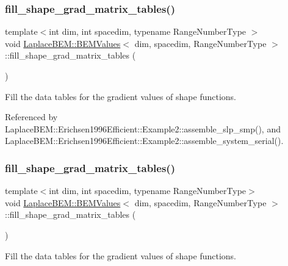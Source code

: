 \subsubsection{\texorpdfstring{fill\+\_\+shape\+\_\+grad\+\_\+matrix\+\_\+tables()}{fill\_shape\_grad\_matrix\_tables()}\hspace{0.1cm}{\footnotesize\ttfamily [1/2]}}
{\footnotesize\ttfamily template$<$int dim, int spacedim, typename Range\+Number\+Type $>$ \\
void \hyperlink{classLaplaceBEM_1_1BEMValues}{Laplace\+B\+E\+M\+::\+B\+E\+M\+Values}$<$ dim, spacedim, Range\+Number\+Type $>$\+::fill\+\_\+shape\+\_\+grad\+\_\+matrix\+\_\+tables (\begin{DoxyParamCaption}{ }\end{DoxyParamCaption})}

Fill the data tables for the gradient values of shape functions. 

Referenced by Laplace\+B\+E\+M\+::\+Erichsen1996\+Efficient\+::\+Example2\+::assemble\+\_\+slp\+\_\+smp(), and Laplace\+B\+E\+M\+::\+Erichsen1996\+Efficient\+::\+Example2\+::assemble\+\_\+system\+\_\+serial().

\mbox{\label{classLaplaceBEM_1_1BEMValues_a5383d5eb891f8cd742584e95aad976c8}} 
\subsubsection{\texorpdfstring{fill\+\_\+shape\+\_\+grad\+\_\+matrix\+\_\+tables()}{fill\_shape\_grad\_matrix\_tables()}\hspace{0.1cm}{\footnotesize\ttfamily [2/2]}}
{\footnotesize\ttfamily template$<$int dim, int spacedim, typename Range\+Number\+Type$>$ \\
void \hyperlink{classLaplaceBEM_1_1BEMValues}{Laplace\+B\+E\+M\+::\+B\+E\+M\+Values}$<$ dim, spacedim, Range\+Number\+Type $>$\+::fill\+\_\+shape\+\_\+grad\+\_\+matrix\+\_\+tables (\begin{DoxyParamCaption}{ }\end{DoxyParamCaption})}

Fill the data tables for the gradient values of shape functions. \mbox{\label{classLaplaceBEM_1_1BEMValues_a3fd86680a51e688d003d5a0bfe09629f}} 
